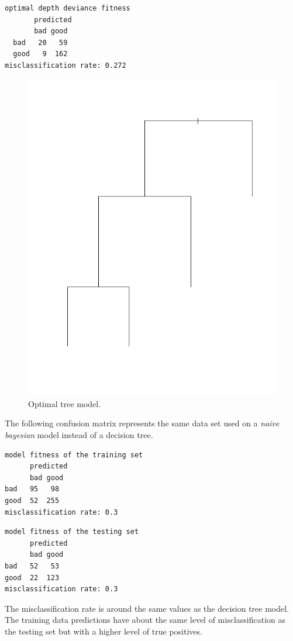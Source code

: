 \documentclass[a4paper,12pt]{article}
\begin{document}
\begin{verbatim}
optimal depth deviance fitness
       predicted
       bad good
  bad   20   59
  good   9  162
misclassification rate: 0.272
\end{verbatim}

\begin{figure}[H]
\centering
\begin{minipage}[]{0.5\textwidth}
  \includegraphics[width=\textwidth]{figures/best_subtree.png}  
  \caption{Optimal tree model. \label{fig:best_subtree}}
 \end{minipage}
\end{figure}

The following confusion matrix represents the same data set used on a \textit{naive bayesian} model instead of a decision tree.

\begin{verbatim}
model fitness of the training set
      predicted
      bad good
bad   95   98
good  52  255
misclassification rate: 0.3
\end{verbatim}
\begin{verbatim}
model fitness of the testing set 
      predicted
      bad good
bad   52   53
good  22  123
misclassification rate: 0.3
\end{verbatim}
The misclassification rate is around the same values as the decision tree model. The training data predictions have about the same level of misclassification as the testing set but with a higher level of true positives.
\end{document}
